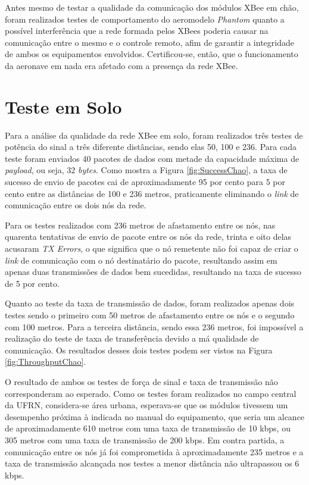\label{Cap:Resultados}

Antes mesmo de testar a qualidade da comunicação dos módulos XBee em chão, foram realizados testes de comportamento do aeromodelo \emph{Phantom} quanto a possível interferência que a rede formada pelos XBees poderia causar na comunicação entre o mesmo e o controle remoto, afim de garantir a integridade de ambos os equipamentos envolvidos. Certificou-se, então, que o funcionamento da aeronave em nada era afetado com a presença da rede XBee.

\section{Teste em Solo}

Para a análise da qualidade da rede XBee em solo, foram realizados três testes de potência do sinal a três diferente distâncias, sendo elas 50, 100 e 236. Para cada teste foram enviados 40 pacotes de dados com metade da capacidade máxima de \emph{payload}, ou seja, 32 \emph{bytes}. Como mostra a Figura \ref{fig:SuccessChao}, a taxa de sucesso de envio de pacotes cai de aproximadamente 95 por cento para 5 por cento entre as distâncias de 100 e 236 metros, praticamente eliminando o \emph{link} de comunicação entre os dois nós da rede.

Para os testes realizados com 236 metros de afastamento entre os nós, nas quarenta tentativas de envio de pacote entre os nós da rede, trinta e oito delas acusaram \emph{TX Errors}, o que significa que o nó remetente não foi capaz de criar o \emph{link} de comunicação com o nó destinatário do pacote, resultando assim em apenas duas transmissões de dados bem sucedidas, resultando na taxa de sucesso de 5 por cento.

Quanto ao teste da taxa de transmissão de dados, foram realizados apenas dois testes sendo o primeiro com 50 metros de afastamento entre os nós e o segundo com 100 metros. Para a terceira distância, sendo essa 236 metros, foi impossível a realização do teste de taxa de transferência devido a má qualidade de comunicação. Os resultados desses dois testes podem ser vistos na Figura \ref{fig:ThroughputChao}.

O resultado de ambos os testes de força de sinal e taxa de transmissão não corresponderam ao esperado. Como os testes foram realizados no campo central da UFRN, considera-se área urbana, esperava-se que os módulos tivessem um desempenho próxima à indicada no manual do equipamento, que seria um alcance de aproximadamente 610 metros com uma taxa de transmissão de 10 kbps, ou 305 metros com uma taxa de transmissão de 200 kbps. Em contra partida, a comunicação entre os nós já foi comprometida à aproximadamente 235 metros e a taxa de transmissão alcançada nos testes a menor distância não ultrapassou os 6 kbps. 

